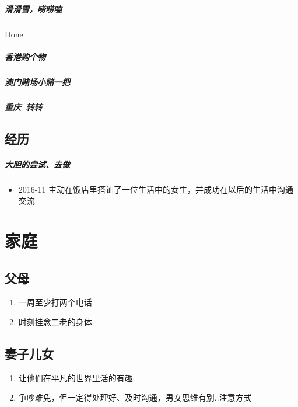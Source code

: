\documentclass[UTF8,a4paper,8pt]{ctexbook}
\begin{document}
	    \paragraph{滑滑雪，唠唠嗑}Done
	    \paragraph{香港购个物}
	    \paragraph{澳门赌场小赌一把}
	    \paragraph{重庆\ 转转}
	    
    \section{经历}
	    \paragraph{大胆的尝试、去做}
		   \begin{itemize}
			   	\item 2016-11 主动在饭店里搭讪了一位生活中的女生，并成功在以后的生活中沟通交流
		   \end{itemize}

\chapter{家庭}    
    \section{父母}
	    \begin{enumerate}
	    	\item 一周至少打两个电话
	    	\item 时刻挂念二老的身体
	    \end{enumerate}
    
	\section{妻子儿女}
		\begin{enumerate}
			\item 让他们在平凡的世界里活的有趣
			\item 争吵难免，但一定得处理好、及时沟通，男女思维有别..注意方式
		\end{enumerate}
\end{document}
